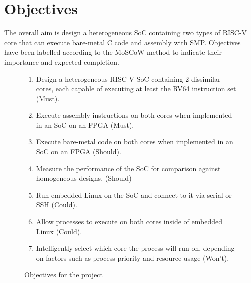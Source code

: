 \section{Objectives}
The overall aim is design a heterogeneous SoC containing two types of RISC-V core that can execute bare-metal C code and assembly with SMP. Objectives have been labelled according to the MoSCoW method\cite{case-method-fasttrack} to indicate their importance and expected completion.
\begin{figure}[h!]
    \centering
    \begin{enumerate}
        \item Design a heterogeneous RISC-V SoC containing 2 dissimilar cores, each capable of executing at least the RV64 instruction set (Must).
        \item Execute assembly instructions on both cores when implemented in an SoC on an FPGA (Must).
        \item Execute bare-metal code on both cores when implemented in an SoC on an FPGA (Should).
        \item Measure the performance of the SoC for comparison against homogeneous designs. (Should)
        \item Run embedded Linux on the SoC and connect to it via serial or SSH (Could).
        \item Allow processes to execute on both cores inside of embedded Linux (Could).
        \item Intelligently select which core the process will run on, depending on factors such as process priority and resource usage (Won't).
    \end{enumerate}
    \caption{Objectives for the project}
    \label{fig:objectives}
\end{figure}